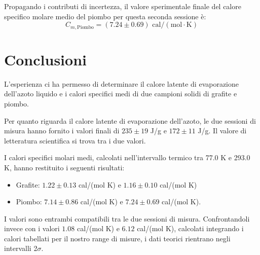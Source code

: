 \documentclass[a4paper,12pt]{article}
\begin{document}
Propagando i contributi di incertezza, il valore sperimentale finale del calore specifico molare medio del piombo per questa seconda sessione è:
\begin{equation*}
    C_{m, \text{Piombo}} = (7.24 \pm 0.69)\text{ cal}/(\text{mol}\cdot\text{K})
\end{equation*}

\section{Conclusioni}

L'esperienza ci ha permesso di determinare il calore latente di evaporazione dell'azoto
liquido e i calori specifici medi di due campioni solidi di grafite e piombo.

Per quanto riguarda il calore latente di evaporazione dell'azoto, le due sessioni di misura hanno
fornito i valori finali di $235 \pm 19$ J/g e $172 \pm 11$ J/g.
Il valore di letteratura scientifica si trova tra i due valori.

I calori specifici molari medi, calcolati nell'intervallo termico tra 77.0 K e 293.0 K, hanno restituito
i seguenti risultati:
\begin{itemize}
    \item Grafite: $1.22 \pm 0.13$ cal/(mol K) e $1.16 \pm 0.10$ cal/(mol K)    
    \item Piombo: $7.14 \pm 0.86$ cal/(mol K) e $7.24 \pm 0.69$ cal/(mol K).
\end{itemize}

I valori sono entrambi compatibili tra le due sessioni di misura.
Confrontandoli invece con i valori $1.08$ cal/(mol K) e $6.12$ cal/(mol K), calcolati integrando i calori tabellati per il nostro range di misure, i dati teorici rientrano negli intervalli 2$\sigma$.
\end{document}
